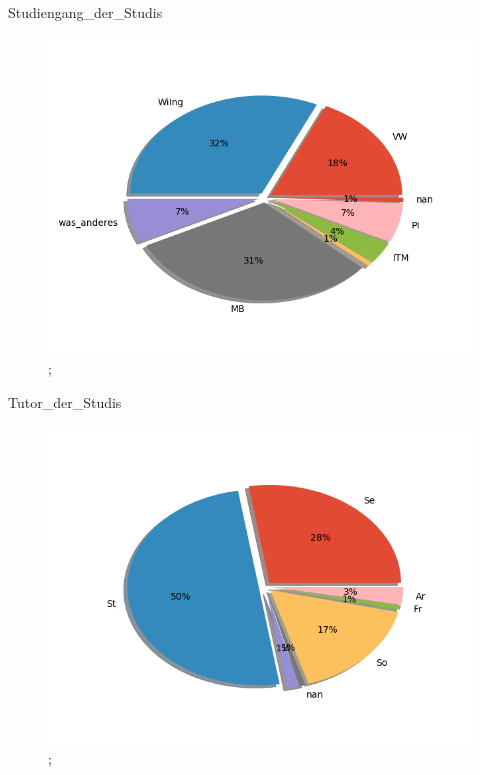 \documentclass[10pt]{beamer}
\begin{document}
\begin{frame}[fragile]{Studiengang_der_Studis} 
 \begin{figure}
 \includegraphics[width= 0.9\linewidth]{./PDFcreater/Plots/Studiengang_der_Studis.png};
 \end{figure}
 \end{frame}
\begin{frame}[fragile]{Tutor_der_Studis} 
 \begin{figure}
 \includegraphics[width= 0.9\linewidth]{./PDFcreater/Plots/Tutor_der_Studis.png};
 \end{figure}
 \end{frame}
\end{document}
